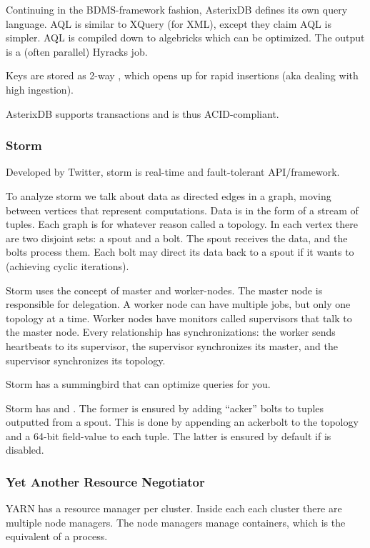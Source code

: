 Continuing in the BDMS-framework fashion, AsterixDB defines its own query language.
AQL is similar to XQuery (for XML), except they claim AQL is simpler. AQL is compiled down to algebricks
which can be optimized. The output is a (often parallel) Hyracks job.

Keys are stored as 2-way , which opens up for rapid insertions 
(aka dealing with high ingestion).

AsterixDB supports transactions and is thus ACID-compliant.


\subsubsection{Storm}\label{sec:storm}
Developed by Twitter, storm is real-time and fault-tolerant API/framework.

To analyze storm we talk about data as directed edges in a graph, moving between vertices
that represent computations. Data is in the form of a stream of tuples.
Each graph is for whatever reason called a topology. In each vertex there are
two disjoint sets: a spout and a bolt. The spout receives the data, and the bolts
process them. Each bolt may direct its data back to a spout if it wants to (achieving cyclic iterations).

Storm uses the concept of master and worker-nodes. The master node is responsible for delegation.
A worker node can have multiple jobs, but only one topology at a time. Worker nodes have 
monitors called supervisors that talk to the master node.
Every relationship has synchronizations: the worker sends heartbeats to its supervisor, the supervisor
synchronizes its master,  and the supervisor synchronizes its topology.

Storm has a summingbird that can optimize queries for you.

Storm has  and . The former is ensured
by adding ``acker'' bolts to tuples outputted from a spout. This is done by appending
an ackerbolt to the topology and a 64-bit field-value to each tuple. The latter is
ensured by default if  is disabled.


\subsubsection{Yet Another Resource Negotiator}\label{sec:YARN}
YARN has a resource manager per cluster. Inside each each cluster there are multiple
node managers. The node managers manage containers, which is the equivalent of 
a process.

